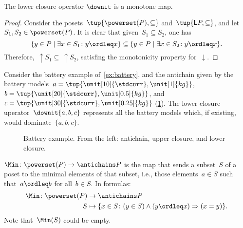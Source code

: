 \begin{lemma}
    The lower closure operator $\downit$ is a monotone map.
\end{lemma}

\begin{proof}
    Consider the posets~$\tup{\powerset(P),\subseteq}$ and~$\tup{\mathsf{L}P,\subseteq}$, and let~$S_1,S_2\in \powerset(P)$. It is clear that given~$S_1\subseteq S_2$, one has
    \begin{equation}
        \{y\in P\mid \exists x\in S_1\colon y\ordleq x\} \subseteq \{y\in P\mid \exists x\in S_2\colon y\ordleq x\}.
    \end{equation}
    Therefore,~$\uparrow S_1\subseteq \ \uparrow S_2$, satisfing the monotonicity property for~$\downarrow$.
\end{proof}



\begin{example}
    Consider the battery example of~\cref{ex:battery}, and the antichain given by the battery models~$a=\tup{\unit[10]{\stdcurr},\unit[1]{kg}}$,~$b=\tup{\unit[20]{\stdcurr},\unit[0.5]{kg}}$, and~$c=\tup{\unit[30]{\stdcurr},\unit[0.25]{kg}}$ (\cref{fig:examplebatt}).
    The lower closure uperator~$\downit\{a,b,c\}$ represents all the battery models which, if existing, would dominate~$\{a,b,c\}$.

\end{example}
\begin{figure}[h!]
    \begin{center}
    \end{center}
    \caption{Battery example. From the left: antichain, upper closure, and lower closure.
    \label{fig:examplebatt}}
\end{figure}


\begin{definition}[Min]
    \label{def:Min}
    $\Min \colon \powerset(P) \to \antichains P$ is the map that sends a subset~$S$ of a poset to the minimal elements of that subset, i.e., those elements~$a \in S$ such that~$a \ordleq b$ for all~$b \in S$. In formulas:
    \begin{equation*}
        \begin{aligned}
            \Min \colon \powerset(P) &\to \antichains P\\
            S&\mapsto \{ x\in S\colon (y\in S)\wedge(y\ordleq x)\Rightarrow (x=y)\}.
        \end{aligned}
    \end{equation*}
    Note that~$\Min(S)$ could be empty.
\end{definition}

